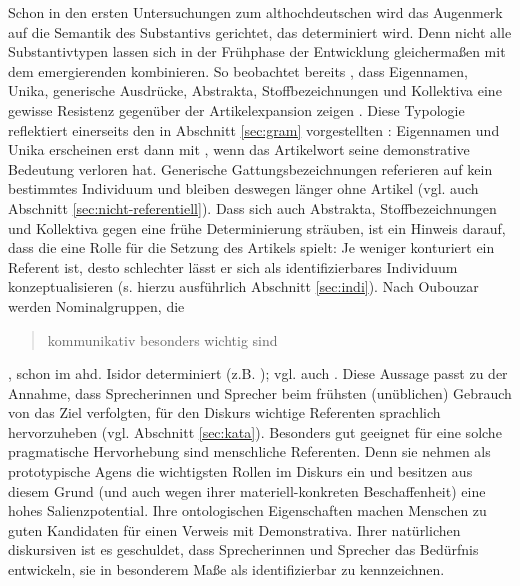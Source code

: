 Schon in den ersten Untersuchungen zum althochdeutschen  wird das Augenmerk auf die Semantik des Substantivs gerichtet, das determiniert wird. Denn nicht alle Substantivtypen lassen sich in der Frühphase der Entwicklung gleichermaßen mit dem emergierenden  kombinieren. So beobachtet bereits \textcite{Graf1905}, dass  Eigennamen,  Unika, generische  Ausdrücke,  Abstrakta, Stoffbezeichnungen und Kollektiva  eine gewisse Resistenz gegenüber der Artikelexpansion  zeigen \parencite[ähnlich][]{Bell1907, Hodler1954}. Diese Typologie reflektiert einerseits den in Abschnitt \ref{sec:gram} vorgestellten : Eigennamen  und Unika  erscheinen erst dann mit , wenn das Artikelwort seine demonstrative Bedeutung verloren hat. Generische Gattungsbezeichnungen   referieren auf kein bestimmtes Individuum und bleiben deswegen länger ohne Artikel (vgl. auch Abschnitt \ref{sec:nicht-referentiell}). Dass sich auch  Abstrakta, Stoffbezeichnungen  und Kollektiva  gegen eine frühe Determinierung sträuben, ist ein Hinweis darauf, dass die  eine Rolle für die Setzung des Artikels spielt: Je weniger konturiert ein Referent ist, desto schlechter lässt er sich als identifizierbares Individuum konzeptualisieren (s. hierzu ausführlich Abschnitt \ref{sec:indi}). 
Nach Oubouzar werden Nominalgruppen, die \blockcquote[75]{Oubouzar1992}{kommunikativ besonders wichtig sind}, schon im ahd. Isidor determiniert (z.B.  ); vgl. auch \textcite[][117--118]{Oubouzar1989}.  
Diese Aussage passt zu der Annahme, dass Sprecherinnen  und Sprecher beim frühsten (unüblichen) Gebrauch von  das Ziel verfolgten, für den Diskurs wichtige Referenten sprachlich hervorzuheben (vgl. Abschnitt \ref{sec:kata}). 
Besonders gut geeignet für eine solche pragmatische Hervorhebung sind menschliche Referenten. Denn sie nehmen als prototypische Agens 
 die wichtigsten Rollen  im Diskurs ein und besitzen aus diesem Grund (und auch wegen ihrer materiell-konkreten Beschaffenheit) eine hohes Salienzpotential. Ihre ontologischen Eigenschaften machen Menschen zu guten Kandidaten für einen Verweis mit  Demonstrativa. Ihrer natürlichen diskursiven  ist es geschuldet, dass Sprecherinnen und Sprecher das Bedürfnis entwickeln, sie in besonderem Maße als identifizierbar zu kennzeichnen. 
